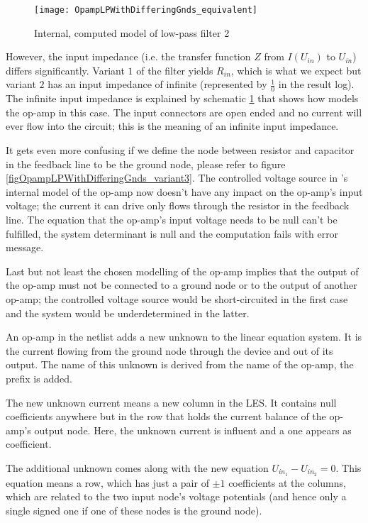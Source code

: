 \begin{figure}[tb]
\begin{center}
\texttt{[image: OpampLPWithDifferingGnds\_equivalent]}
\caption{Internal, computed model of low-pass filter 2}
\label{figOpampLPWithDifferingGnds_equivalent}
\end{center}
\end{figure}

However, the input impedance (i.e. the transfer function $Z$ from
$I\left(U_{in}\right)$ to $U_{in}$) differs significantly. Variant $1$ of
the filter yields $R_{in}$, which is what we expect but variant $2$ has an
input impedance of infinite (represented by $\frac{1}{0}$ in the result
log). The infinite input impedance is explained by schematic
\ref{figOpampLPWithDifferingGnds_equivalent} that shows how \linnet{}
models the op-amp in this case. The input connectors are open ended and no
current will ever flow into the circuit; this is the meaning of an
infinite input impedance.

It gets even more confusing if we define the node between resistor and
capacitor in the feedback line to be the ground node, please refer to
figure \ref{figOpampLPWithDifferingGnds_variant3}. The controlled voltage
source in \linnet{}'s internal model of the op-amp now doesn't have any
impact on the op-amp's input voltage; the current it can drive only flows
through the resistor in the feedback line. The equation that the op-amp's
input voltage needs to be null can't be fulfilled, the system determinant
is null and the computation fails with error message.

Last but not least the chosen modelling of the op-amp implies that the
output of the op-amp must not be connected to a ground node or to the
output of another op-amp; the controlled voltage source would be
short-circuited in the first case and the system would be underdetermined
in the latter.

An op-amp in the netlist adds a new unknown to the linear equation
system. It is the current flowing from the ground node through the device
and out of its output. The name of this unknown is derived from the name
of the op-amp, the prefix  is added. 

The new unknown current means a new column in the LES. It contains null
coefficients anywhere but in the row that holds the current balance
of the op-amp's output node. Here, the unknown current is influent and a
one appears as coefficient.

The additional unknown comes along with the new equation $U_{in_1} -
U_{in_2} = 0$. This equation means a row, which has just a pair of $\pm 1$
coefficients at the columns, which are related to the two input node's
voltage potentials (and hence only a single signed one if one of these
nodes is the ground node).

